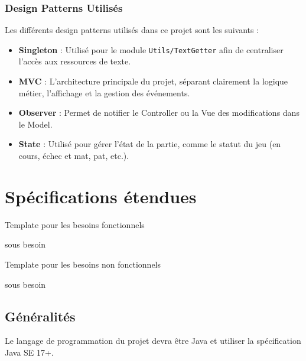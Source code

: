 \documentclass{article}
\begin{document}
\subsubsection{Design Patterns Utilisés}

Les différents design patterns utilisés dans ce projet sont les suivants : 
\begin{itemize}
    \item \textbf{Singleton} : Utilisé pour le module \texttt{Utils/TextGetter} afin de centraliser l'accès aux ressources de texte.
    \item \textbf{MVC} : L'architecture principale du projet, séparant clairement la logique métier, l'affichage et la gestion des événements.
    \item \textbf{Observer} : Permet de notifier le Controller ou la Vue des modifications dans le Model.
    \item \textbf{State} : Utilisé pour gérer l'état de la partie, comme le statut du jeu (en cours, échec et mat, pat, etc.).
\end{itemize}


\section{Spécifications étendues}

\begin{needbox}[F?: Titre]
    Template pour les besoins fonctionnels
    \begin{subneedbox}[F?.?: Titre]
        sous besoin 
    \end{subneedbox}
\end{needbox}

\begin{nonfunctionnalneedbox}[F?: Titre]
    Template pour les besoins non fonctionnels
    \begin{subneedbox}[F?.?: Titre]
        sous besoin
    \end{subneedbox}
\end{nonfunctionnalneedbox}

\subsection{Généralités}

\begin{nonfunctionnalneedbox}
    Le langage de programmation du projet devra être Java et utiliser la spécification Java SE 17+.
\end{nonfunctionnalneedbox}
\end{document}
